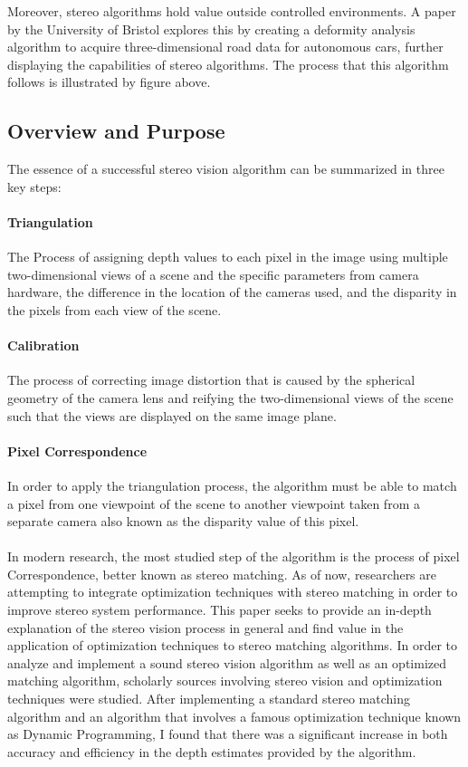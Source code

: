 \documentclass[11pt]{scrartcl}
\begin{document}
Moreover, stereo algorithms hold value outside controlled environments. A paper by the University of Bristol explores this by creating a deformity analysis algorithm  to acquire three-dimensional road data for autonomous cars, further displaying the
capabilities of stereo algorithms. The process that this algorithm follows is illustrated by
figure above.

\subsection{Overview and Purpose}

The essence of a successful stereo vision algorithm can be summarized in three key steps:

\paragraph{ Triangulation} The Process of assigning depth values to each pixel in the image
using multiple two-dimensional views of a scene and the specific parameters from
camera hardware, the difference in the location of the cameras used, and the disparity in the
pixels from each view of the scene.
\paragraph{ Calibration}  The process of correcting image distortion that is caused by the
spherical geometry of the camera lens
and reifying the two-dimensional views of the scene such that
the views are displayed on the same image plane. 
\paragraph{Pixel Correspondence} In order to apply the triangulation process, the algorithm must be
able to match a pixel from one viewpoint of the scene to another viewpoint taken from a separate camera
also known as the disparity value of this pixel.
\\

\\

In modern research, the most studied step of the algorithm is the process of pixel Correspondence, better known as stereo matching. As of now, researchers are attempting to integrate optimization techniques with stereo matching in order to improve stereo system performance. This paper seeks to provide an in-depth explanation of the stereo vision process in general and find value in the application of optimization techniques to stereo matching algorithms. In order to analyze and implement a sound stereo vision algorithm
as well as an optimized matching algorithm, scholarly sources involving stereo vision and optimization techniques were studied. After implementing a standard stereo matching algorithm and an algorithm that involves a famous optimization technique known as Dynamic Programming, I found that there was a significant increase
in both accuracy and efficiency in the depth estimates provided by the algorithm.
\end{document}
